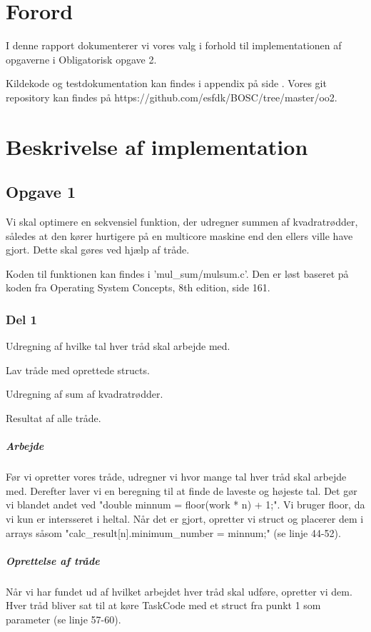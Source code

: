 \chapter{Forord}
I denne rapport dokumenterer vi vores valg i forhold til implementationen af opgaverne i Obligatorisk opgave 2.

Kildekode og testdokumentation kan findes i appendix på side \pageref{Appendix}. Vores git repository kan findes på https://github.com/esfdk/BOSC/tree/master/oo2.

\chapter{Beskrivelse af implementation}
\section{Opgave 1}
\label{O1}
Vi skal optimere en sekvensiel funktion, der udregner summen af kvadratrødder, således at den kører hurtigere på en multicore maskine end den ellers ville have gjort. Dette skal gøres ved hjælp af tråde.

Koden til funktionen kan findes i 'mul\_sum/mulsum.c'. Den er løst baseret på koden fra Operating System Concepts, 8th edition, side 161.

\subsection{Del 1}
\label{O1_1}
\begin{my_itemize}
\item Udregning af hvilke tal hver tråd skal arbejde med.
\item Lav tråde med oprettede structs.
\item Udregning af sum af kvadratrødder.
\item Resultat af alle tråde.
\end{my_itemize}
\paragraph{Arbejde} Før vi opretter vores tråde, udregner vi hvor mange tal hver tråd skal arbejde med. Derefter laver vi en beregning til at finde de laveste og højeste tal. Det gør vi blandet andet ved "double minnum = floor(work * n) + 1;". Vi bruger floor, da vi kun er intersseret i heltal. Når det er gjort, opretter vi struct og placerer dem i arrays såsom "calc\_result[n].minimum\_number = minnum;" (se linje 44-52). 
\paragraph{Oprettelse af tråde} Når vi har fundet ud af hvilket arbejdet hver tråd skal udføre, opretter vi dem. Hver tråd bliver sat til at køre TaskCode med et struct fra punkt 1 som parameter (se linje 57-60).
